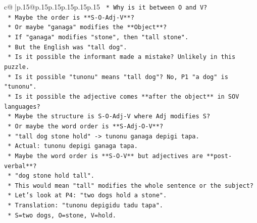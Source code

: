 \documentclass{article}
\begin{document}
{\begin{supertabular}{c@{$\;$}|p{.15\linewidth}@{}p{.15\linewidth}p{.15\linewidth}p{.15\linewidth}p{.15\linewidth}p{.15\linewidth}}
{{{\texttt{                                            *   Why is it between O and V?} \\
\texttt{                                            *   Maybe the order is **S{-}O{-}Adj{-}V**?} \\
\texttt{                                            *   Or maybe "ganaga" modifies the **Object**?} \\
\texttt{                                            *   If "ganaga" modifies "stone", then "tall stone".} \\
\texttt{                                            *   But the English was "tall dog".} \\
\texttt{                                            *   Is it possible the informant made a mistake? Unlikely in this puzzle.} \\
\texttt{                                            *   Is it possible "tunonu" means "tall dog"? No, P1 "a dog" is "tunonu".} \\
\texttt{                                            *   Is it possible the adjective comes **after the object** in SOV languages?} \\
\texttt{                                            *   Maybe the structure is S{-}O{-}Adj{-}V where Adj modifies S?} \\
\texttt{                                            *   Or maybe the word order is **S{-}Adj{-}O{-}V**?} \\
\texttt{                                                *   "tall dog stone hold" {-}> tunonu ganaga depigi tapa.} \\
\texttt{                                                *   Actual: tunonu depigi ganaga tapa.} \\
\texttt{                                            *   Maybe the word order is **S{-}O{-}V** but adjectives are **post{-}verbal**?} \\
\texttt{                                            *   "dog stone hold tall".} \\
\texttt{                                            *   This would mean "tall" modifies the whole sentence or the subject?} \\
\texttt{                                            *   Let's look at P4: "two dogs hold a stone".} \\
\texttt{                                            *   Translation: "tunonu depigidu tadu tapa".} \\
\texttt{                                            *   S=two dogs, O=stone, V=hold.} \\
}}}
\end{supertabular}}
\end{document}
